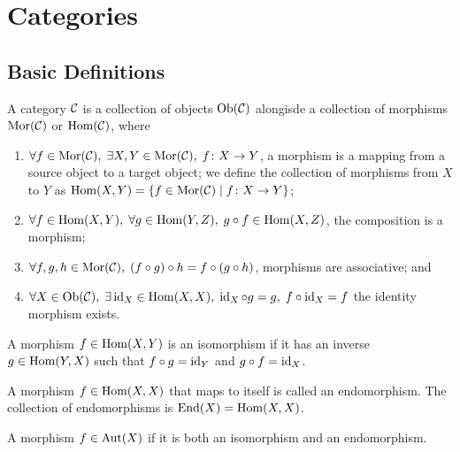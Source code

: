 \section{Categories}

\subsection{Basic Definitions}

\begin{definition}
    A category \(\mathcal{C}\) is a collection of objects \(\operatorname{Ob}(\mathcal{C})\)
    alongisde a collection of morphisms \(\operatorname{Mor}(\mathcal{C})\) or \(\operatorname{Hom}(\mathcal{C})\),
    where
    \begin{enumerate}[label={(\roman*)}, itemsep=0mm]
        \item \(\forall f \in \operatorname{Mor}(\mathcal{C}),\; \exists X,Y \in \operatorname{Mor}(\mathcal{C}),\; f\colon X\to Y\),
            a morphism is a mapping from a source object to a target object;
            we define the collection of morphisms from \(X\) to \(Y\)
            as \(\operatorname{Hom}(X,Y) = \{f\in\operatorname{Mor}(\mathcal{C}) \mid f\colon X\to Y\}\);
        \item \(\forall f \in \operatorname{Hom}(X,Y),\; \forall g \in \operatorname{Hom}(Y,Z),\; g \circ f \in \operatorname{Hom}(X,Z)\),
            the composition is a morphism;
        \item \(\forall f,g,h \in \operatorname{Mor}(\mathcal{C}),\; (f \circ g) \circ h = f \circ (g \circ h)\),
            morphisms are associative; and
        \item \(\forall X \in \operatorname{Ob}(\mathcal{C}),\; \exists \operatorname{id}_X \in \operatorname{Hom}(X,X),\; \operatorname{id}_X \circ g = g,\; f \circ \operatorname{id}_X = f\)
            the identity morphism exists.
    \end{enumerate}
\end{definition}

\begin{definition}
    A morphism \(f \in \operatorname{Hom}(X,Y)\) is an isomorphism
    if it has an inverse \(g \in \operatorname{Hom}(Y,X)\)
    such that \(f \circ g = \operatorname{id}_Y\) and \(g \circ f = \operatorname{id}_X\).
\end{definition}
\begin{definition}
    A morphism \(f \in \operatorname{Hom}(X,X)\) that maps to itself is called an endomorphism.
    The collection of endomorphisms is \(\operatorname{End}(X) = \operatorname{Hom}(X,X)\).
\end{definition}
\begin{definition}
    A morphism \(f \in \operatorname{Aut}(X)\) if it is both an isomorphism and an endomorphism.
\end{definition}

